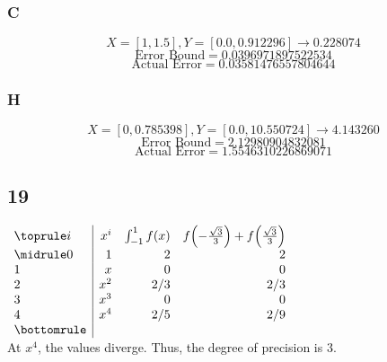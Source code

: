 \documentclass{oisinclass}
\begin{document}
\subsubsection*{C}
\[
	X = [1, 1.5], Y = [0.0, 0.912296]\rightarrow  0.228074
\]
\[
	\text{Error Bound} =  0.0396971897522534
\]
\[
	\text{Actual Error} =  0.03581476557804644
\]
\subsubsection*{H}
\[
	X = [0, 0.785398], Y = [0.0, 10.550724] \rightarrow 4.143260
\]
\[
	\text{Error Bound} =  2.12980904832081
\]
\[
	\text{Actual Error} =  1.5546310226869071
\]
\subsection*{19}
\(
\begin{array}{l|rrr}
	\toprule
	i & x^i & \int_{-1}^{1}f(x) & f{\left(- \frac{\sqrt{3}}{3} \right)} + f{\left(\frac{\sqrt{3}}{3} \right)} \\
	\midrule
	0 & 1   & 2                 & 2                                                                           \\
	1 & x   & 0                 & 0                                                                           \\
	2 & x^2 & 2/3               & 2/3                                                                         \\
	3 & x^3 & 0                 & 0                                                                           \\
	4 & x^4 & 2/5               & 2/9                                                                         \\
	\bottomrule
\end{array}
\)\\
At \(x^4\), the values diverge. Thus, the degree of precision is 3.
\end{document}
